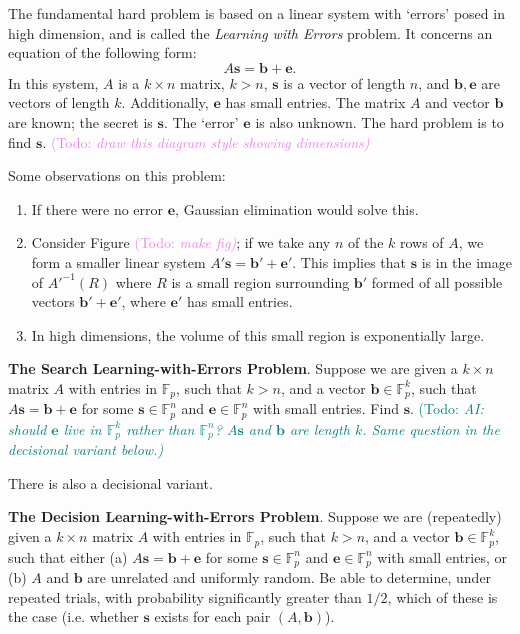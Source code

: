 \documentclass{article}
\theoremstyle{plain}
\theoremstyle{definition}
\theoremstyle{remark}
\numberwithin{theorem}{section}
\newcommand{\KS}[1]{\textcolor{violet}{{\sf (Todo:} {\sl{#1})}}}
\newcommand{\todo}[1]{\textcolor{teal}{{\sf (Todo:} {\sl{#1})}}}
\newcommand{\KS}[1]{}
\newcommand{\todo}[1]{}
\newcommand{\FF}{\mathbb{F}}
\begin{document}
The fundamental hard problem is based on a linear system with `errors' posed in high dimension, and is called the \emph{Learning with Errors} problem.  It concerns an equation of the following form:
\[
A \mathbf{s} = \mathbf{b} + \mathbf{e}.
\]
In this system, $A$ is a $k \times n$ matrix, $k > n$, $\mathbf{s}$ is a vector of length $n$, and $\mathbf{b}, \mathbf{e}$ are vectors of length $k$.  Additionally, $\mathbf{e}$ has small entries.  The matrix $A$ and vector $\mathbf{b}$ are known; the secret is $\mathbf{s}$.  The `error' $\mathbf{e}$ is also unknown.  The hard problem is to find $\mathbf{s}$. \KS{draw this diagram style showing dimensions}

Some observations on this problem:
\begin{enumerate}
    \item If there were no error $\mathbf{e}$, Gaussian elimination would solve this.
    \item Consider Figure \KS{make fig}; if we take any $n$ of the $k$ rows of $A$, we form a smaller linear system $A' \mathbf{s} = \mathbf{b}' + \mathbf{e}'$.  This implies that $\mathbf{s}$ is in the image of $A'^{-1}(R)$ where $R$ is a small region surrounding $\mathbf{b}'$ formed of all possible vectors $\mathbf{b}' + \mathbf{e}'$, where $\mathbf{e}'$ has small entries.
    \item In high dimensions, the volume of this small region is exponentially large.
\end{enumerate}

\textbf{The Search Learning-with-Errors Problem}.  Suppose we are given a $k \times n$ matrix $A$ with entries in $\FF_p$, such that $k > n$, and a vector $\mathbf{b} \in \FF_p^k$, such that $A \mathbf{s} = \mathbf{b} + \mathbf{e}$ for some $\mathbf{s} \in \FF_p^n$ and $\mathbf{e} \in \FF_p^n$ with small entries.  Find $\mathbf{s}$.  \todo{AI: should $\mathbf{e}$ live in $\FF_p^k$ rather than $\FF_p^n$?  $A\mathbf{s}$ and $\mathbf{b}$ are length $k$.  Same question in the decisional variant below.}

There is also a decisional variant.

\textbf{The Decision Learning-with-Errors Problem}.  Suppose we are (repeatedly) given a $k \times n$ matrix $A$ with entries in $\FF_p$, such that $k > n$, and a vector $\mathbf{b} \in \FF_p^k$, such that either (a) $A \mathbf{s} = \mathbf{b} + \mathbf{e}$ for some $\mathbf{s} \in \FF_p^n$ and $\mathbf{e} \in \FF_p^n$ with small entries, or (b) $A$ and $\mathbf{b}$ are unrelated and uniformly random.   Be able to determine, under repeated trials, with probability significantly greater than $1/2$, which of these is the case (i.e. whether $\mathbf{s}$ exists for each pair $(A, \mathbf{b})$).
\end{document}
